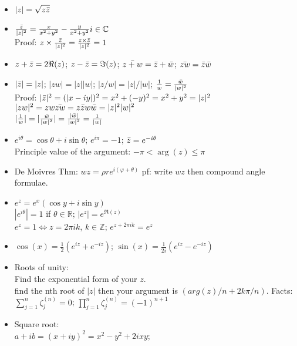 \documentclass[10pt]{article}
\begin{document}

\begin{multicols}{2}
\begin{itemize}
    \item $|z|=\sqrt{z\Bar{z}}$
    \item $\frac{\Bar{z}}{|z|^{2}}=\frac{x}{x^{2}+y^{2}}-\frac{y}{x^{2}+y^{2}}i\in\mathbb{C}$\\
    Proof: $z\times\frac{\Bar{z}}{|z|^{2}}=\frac{z\times\Bar{z}}{|z|^{2}}=1$
    \item $z+\Bar{z}=2\Re(z)$; $z-\Bar{z}=\Im(z)$; $\Bar{z+w}=\Bar{z}+\Bar{w}$; $\Bar{zw}=\Bar{z}\Bar{w}$
    \item $|\Bar{z}|=|z|$; $|zw|=|z||w|$; $|z/w|=|z|/|w|$; $\frac{1}{w}=\frac{\Bar{w}}{|w|^{2}}$\\
    Proof: $|\Bar{z}|^{2}=(|x-iy|)^{2}=x^{2}+(-y)^{2}=x^{2}+y^{2}=|z|^{2}$\\
    $|zw|^{2}=zw\Bar{zw}=z\Bar{z}w\Bar{w}=|z|^{2}|w|^{2}$\\
    $|\frac{1}{w}|=|\frac{\Bar{w}}{|w|^{2}}|=\frac{|\Bar{w}|}{|w|^{2}}=\frac{1}{|w|}$
    \item $e^{i\theta}=\cos\theta+i\sin\theta$; $e^{i\pi}=-1$; $\Bar{z}=e^{-i\theta}$\\
    Principle value of the argument: $-\pi<\arg(z)\leq\pi$
    \item De Moivres Thm: $wz=\rho re^{i(\varphi+\theta)}$ pf: write $wz$ then compound angle formulae.
    \item $e^{z}=e^{x}(\cos y+i\sin y)$\\
    $|e^{i\theta}|=1$ if $\theta\in\mathbb{R}$; $|e^{z}|=e^{\Re(z)}$\\
    $e^{z}=1\iff z=2\pi ik$, $k\in\mathbb{Z}$; $e^{z+2\pi ik}=e^{z}$
    \item $\cos(x)=\frac{1}{2}(e^{iz}+e^{-iz})$; $\sin(x)=\frac{1}{2i}(e^{iz}-e^{-iz})$
    \item Roots of unity:\\
    Find the exponential form of your $z$.\\
    find the nth root of $|z|$ then your argument is $(arg(z)/n+2k\pi/n)$. Facts:\\
    $\sum^{n}_{j=1}\zeta^{(n)}_{j}=0$; $\prod^{n}_{j=1}\zeta^{(n)}_{j}=(-1)^{n+1}$
    \item Square root:\\
    $a+ib=(x+iy)^{2}=x^{2}-y^{2}+2ixy$;\\

\end{itemize}
\end{multicols}
\end{document}
